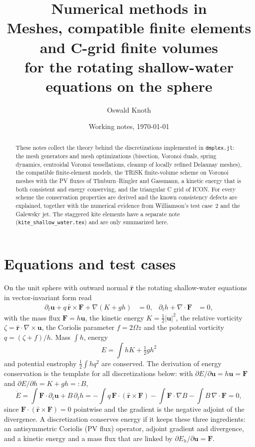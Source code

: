 \documentclass[11pt,a4paper]{article}
\title{Numerical methods in \code{dmplex.jl}\\[2pt]
\large Meshes, compatible finite elements and C-grid finite volumes\\
for the rotating shallow-water equations on the sphere}
\author{Oswald Knoth}
\date{Working notes, \today}
\newcommand{\bu}{\mathbf{u}}
\newcommand{\bF}{\mathbf{F}}
\newcommand{\rhat}{\hat{\mathbf{r}}}
\newcommand{\code}[1]{\texttt{#1}}
\begin{document}
\sloppy
\maketitle

\begin{abstract}
These notes collect the theory behind the discretizations implemented in
\code{dmplex.jl}: the mesh generators and mesh optimizations (bisection,
Voronoi duals, spring dynamics, centroidal Voronoi tessellations, cleanup of
locally refined Delaunay meshes), the compatible finite-element models,
the TRiSK finite-volume scheme on Voronoi meshes with the PV fluxes of
Thuburn--Ringler and Gassmann, a kinetic energy that is both consistent and
energy conserving, and the triangular C grid of ICON. For every scheme the
conservation properties are derived and the known consistency defects are
explained, together with the numerical evidence from Williamson's test case~2
and the Galewsky jet. The staggered kite elements have a separate note
(\code{kite\_shallow\_water.tex}) and are only summarized here.
\end{abstract}

\tableofcontents

\section{Equations and test cases}

On the unit sphere with outward normal $\rhat$ the rotating shallow-water
equations in vector-invariant form read
\begin{align}
  \partial_t\bu + q\,\rhat\times\bF + \nabla(K + gh) &= 0, &
  \partial_t h + \nabla\cdot\bF &= 0,
  \label{eq:sw}
\end{align}
with the mass flux $\bF = h\bu$, the kinetic energy $K=\tfrac12|\bu|^2$, the
relative vorticity $\zeta = \rhat\cdot\nabla\times\bu$, the Coriolis parameter
$f = 2\Omega z$ and the potential vorticity $q = (\zeta+f)/h$. Mass $\int h$,
energy
\begin{equation}
  E = \int h K + \tfrac12 g h^2
\end{equation}
and potential enstrophy $\tfrac12\int hq^2$ are conserved. The derivation of
energy conservation is the template for all discretizations below: with
$\partial E/\partial\bu = h\bu = \bF$ and $\partial E/\partial h = K + gh =: B$,
\[
  \dot E = \int \bF\cdot\partial_t\bu + B\,\partial_t h
         = -\int q\,\bF\cdot(\rhat\times\bF) - \int\bF\cdot\nabla B - \int B\,\nabla\cdot\bF = 0,
\]
since $\bF\cdot(\rhat\times\bF) = 0$ pointwise and the gradient is the negative
adjoint of the divergence. A discretization conserves energy if it keeps these
three ingredients: an antisymmetric Coriolis (PV flux) operator, adjoint
gradient and divergence, and a kinetic energy and a mass flux that are linked by
$\partial E_h/\partial\bu = \bF$.
\end{document}
